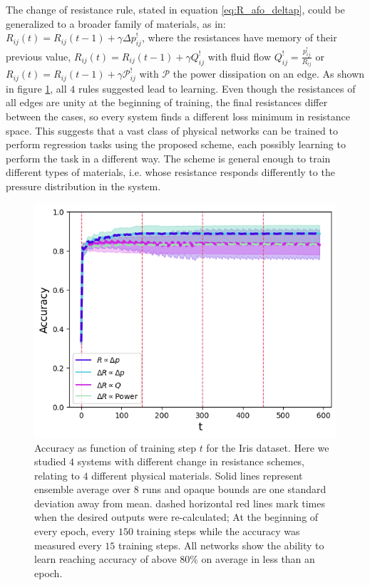 \documentclass[%
 reprint,
 amsmath,amssymb,
 aps,
]{revtex4-2}
\begin{document}
    The change of resistance rule, stated in equation \ref{eq:R_afo_deltap}, could be generalized to a broader family of materials, as in: $R_{ij}\left(t\right)=R_{ij}\left(t-1\right) + \gamma \Delta p^!_{ij}$, where the resistances have memory of their previous value, $R_{ij}\left(t\right) = R_{ij}\left(t-1\right) + \gamma Q^!_{ij}$ with fluid flow $Q^!_{ij}=\frac{p^!_{ij}}{R_{ij}}$ or $R_{ij}\left(t\right)=R_{ij}\left(t-1\right) + \gamma \mathcal{P}^!_{ij}$ with $\mathcal{P}$ the power dissipation on an edge. As shown in figure \ref{fig:accuracy_4_materials}, all $4$ rules suggested lead to learning. Even though the resistances of all edges are unity at the beginning of training, the final resistances differ between the cases, so every system finds a different loss minimum in resistance space. This suggests that a vast class of physical networks can be trained to perform regression tasks using the proposed scheme, each possibly learning to perform the task in a different way. The scheme is general enough to train different types of materials, i.e. whose resistance responds differently to the pressure distribution in the system.

    \begin{figure}[ht]
    \centerline{
    \includegraphics[width=\columnwidth]{Figures/accuracy_vs_t_4_materials.png}
    }
    \caption{Accuracy as function of training step $t$ for the Iris dataset. Here we studied $4$ systems with different change in resistance schemes, relating to $4$ different physical materials. Solid lines represent ensemble average over $8$ runs and opaque bounds are one standard deviation away from mean. dashed horizontal red lines mark times when the desired outputs were re-calculated; At the beginning of every epoch, every $150$ training steps while the accuracy was measured every $15$ training steps. All networks show the ability to learn reaching accuracy of above $80\%$ on average in less than an epoch.}
    \label{fig:accuracy_4_materials}
    \end{figure}
    
\end{document}
